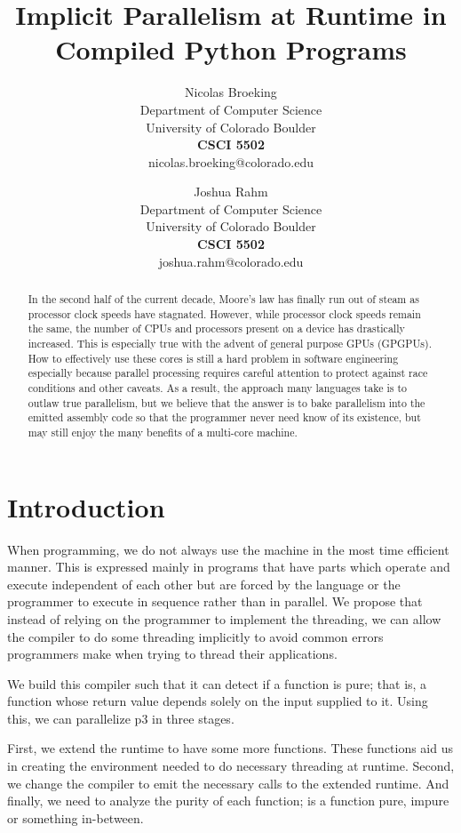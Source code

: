 \documentclass{acm_proc_article-sp}
\title{Implicit Parallelism at Runtime in Compiled Python Programs}
\author{
    Nicolas Broeking \\
    \small Department of Computer Science \\
    \small University of Colorado Boulder \\
    \small \textbf{CSCI 5502} \\
    \small nicolas.broeking@colorado.edu \\
    \and
    Joshua Rahm \\
    \small Department of Computer Science \\
    \small University of Colorado Boulder \\
    \small \textbf{CSCI 5502} \\
    \small joshua.rahm@colorado.edu \\
}
\begin{document}
\maketitle

\begin{abstract}

In the second half of the current decade, Moore's law has
finally run out of steam as processor clock speeds have stagnated. However,
while processor clock speeds remain the same, the number of CPUs and processors
present on a device has drastically increased.  This is especially true with
the advent of general purpose GPUs (GPGPUs). How to effectively use these cores
is still a hard problem in software engineering especially because parallel
processing requires careful attention to protect against race conditions and
other caveats.  As a result, the approach many languages take is to outlaw true
parallelism, but we believe that the answer is to bake parallelism into the emitted
assembly code so that the programmer never need know of its existence, but may still
enjoy the many benefits of a multi-core machine.

\end{abstract}

\section*{Introduction}
When programming, we do not always use the machine in the most time efficient manner.
This is expressed mainly in programs that have parts which operate and execute independent
of each other but are forced by the language or the programmer to execute in sequence rather
than in parallel. We propose that instead of relying on the programmer to implement the threading,
we can allow the compiler to do some threading implicitly to avoid common errors programmers make
when trying to thread their applications.

We build this compiler such that it can detect if a function is pure; that is, a function
whose return value depends solely on the input supplied to it. Using this, we can parallelize
p3 in three stages.

First, we extend the runtime to have some more functions. These functions aid us in creating
the environment needed to do necessary threading at runtime. Second, we change the compiler to
emit the necessary calls to the extended runtime. And finally, we need to analyze the purity
of each function; is a function pure, impure or something in-between.
\end{document}
